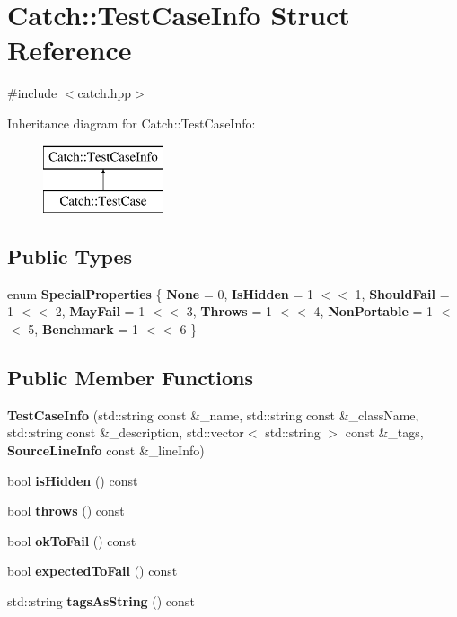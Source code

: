 \section{Catch\+::Test\+Case\+Info Struct Reference}
\label{struct_catch_1_1_test_case_info}


{\ttfamily \#include $<$catch.\+hpp$>$}

Inheritance diagram for Catch\+::Test\+Case\+Info\+:\begin{figure}[H]
\begin{center}
\leavevmode
\includegraphics[height=2.000000cm]{struct_catch_1_1_test_case_info}
\end{center}
\end{figure}
\subsection*{Public Types}
\begin{DoxyCompactItemize}
\item 
enum \textbf{ Special\+Properties} \{ \newline
\textbf{ None} = 0, 
\textbf{ Is\+Hidden} = 1 $<$$<$ 1, 
\textbf{ Should\+Fail} = 1 $<$$<$ 2, 
\textbf{ May\+Fail} = 1 $<$$<$ 3, 
\newline
\textbf{ Throws} = 1 $<$$<$ 4, 
\textbf{ Non\+Portable} = 1 $<$$<$ 5, 
\textbf{ Benchmark} = 1 $<$$<$ 6
 \}
\end{DoxyCompactItemize}
\subsection*{Public Member Functions}
\begin{DoxyCompactItemize}
\item 
\textbf{ Test\+Case\+Info} (std\+::string const \&\+\_\+name, std\+::string const \&\+\_\+class\+Name, std\+::string const \&\+\_\+description, std\+::vector$<$ std\+::string $>$ const \&\+\_\+tags, \textbf{ Source\+Line\+Info} const \&\+\_\+line\+Info)
\item 
bool \textbf{ is\+Hidden} () const
\item 
bool \textbf{ throws} () const
\item 
bool \textbf{ ok\+To\+Fail} () const
\item 
bool \textbf{ expected\+To\+Fail} () const
\item 
std\+::string \textbf{ tags\+As\+String} () const
\end{DoxyCompactItemize}
